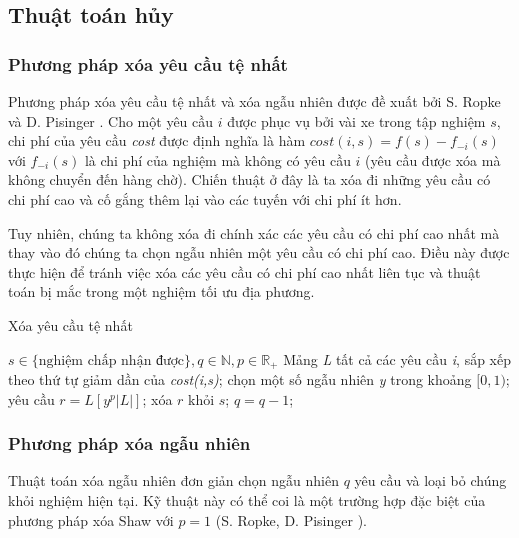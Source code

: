 \subsection{Thuật toán hủy}

\subsubsection*{Phương pháp xóa yêu cầu tệ nhất} 
Phương pháp xóa yêu cầu tệ nhất và xóa ngẫu nhiên được đề xuất bởi S. Ropke và D. Pisinger \cite{ropke2006adaptive}. Cho một yêu cầu $i$ được phục vụ bởi vài xe trong tập nghiệm $s$, chi phí của yêu cầu \textit{cost} được định nghĩa là hàm $cost(i,s)=f(s)-f_{-i}(s)$ với $f_{-i}(s)$ là chi phí của nghiệm mà không có yêu cầu $i$ (yêu cầu được xóa mà không chuyển đến hàng chờ). Chiến thuật ở đây là ta xóa đi những yêu cầu có chi phí cao và cố gắng thêm lại vào các tuyến với chi phí ít hơn.

Tuy nhiên, chúng ta không xóa đi chính xác các yêu cầu có chi phí cao nhất mà thay vào đó chúng ta chọn ngẫu nhiên một yêu cầu có chi phí cao. Điều này được thực hiện để tránh việc xóa các yêu cầu có chi phí cao nhất liên tục và thuật toán bị mắc trong một nghiệm tối ưu địa phương.

\begin{algorithm}
	\label{alg:worst_removal}
	\caption{Xóa yêu cầu tệ nhất}
	\begin{algorithmic}[1]
		\Require $s \in \text{\{nghiệm chấp nhận được\}}, q \in \mathbb{N}, p \in \mathbb{R}_{+}$
		\State Mảng \textit{L} tất cả các yêu cầu \textit{i}, sắp xếp theo thứ tự giảm dần của \textit{cost(i,s)};
		\State chọn một số ngẫu nhiên \textit{y} trong khoảng $[0, 1)$;
		\State yêu cầu $r = L\left[ y^p |L| \right]$;
		\State xóa $r$ khỏi $s$;
		\State $q = q-1$;
		\EndWhile
	\end{algorithmic}
\end{algorithm}

\subsubsection*{Phương pháp xóa ngẫu nhiên}
Thuật toán xóa ngẫu nhiên đơn giản chọn ngẫu nhiên $q$ yêu cầu và loại bỏ chúng khỏi nghiệm hiện tại. Kỹ thuật này có thể coi là một trường hợp đặc biệt của phương pháp xóa Shaw với $p=1$ (S. Ropke, D. Pisinger \cite{ropke2006adaptive}).

